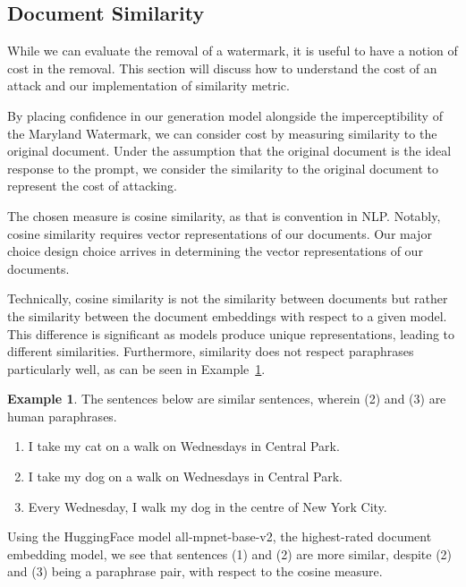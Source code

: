 \documentclass{l4proj}
\theoremstyle{definition}
\newtheorem{example}{Example}[section]
\newcommand{\codefont}[1]{{\fontfamily{lmtt}\selectfont #1}}
\begin{document}
    \subsection{Document Similarity}
        \label{sec:document-similarity}
        While we can evaluate the removal of a watermark, it is useful to have a notion of cost in the removal. This section will discuss how to understand the cost of an attack and our implementation of similarity metric.

        By placing confidence in our generation model alongside the imperceptibility of the Maryland Watermark, we can consider cost by measuring similarity to the original document. Under the assumption that the original document is the ideal response to the prompt, we consider the similarity to the original document to represent the cost of attacking.

        The chosen measure is cosine similarity, as that is convention in NLP. Notably, cosine similarity requires vector representations of our documents. Our major choice design choice arrives in determining the vector representations of our documents. 

        Technically, cosine similarity is not the similarity between documents but rather the similarity between the document embeddings with respect to a given model. This difference is significant as models produce unique representations, leading to different similarities. Furthermore, similarity does not respect paraphrases particularly well, as can be seen in Example~\ref{example:paraphrase-vs-paragraph}.

        \begin{example}
            \label{example:paraphrase-vs-paragraph}
            The sentences below are similar sentences, wherein (2) and (3) are human paraphrases.
            \begin{enumerate}[label=(\arabic*)]
                \item I take my cat on a walk on Wednesdays in Central Park.
                \item I take my dog on a walk on Wednesdays in Central Park.
                \item Every Wednesday, I walk my dog in the centre of New York City.
            \end{enumerate}
            Using the HuggingFace model \codefont{all-mpnet-base-v2}, the highest-rated document embedding model, we see that sentences (1) and (2) are more similar, despite (2) and (3) being a paraphrase pair, with respect to the cosine measure.
        \end{example}
\end{document}
